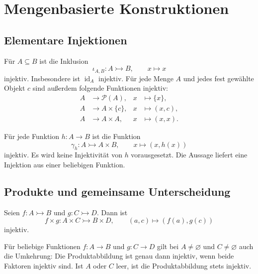 \chapter{Mengenbasierte Konstruktionen}
\label{b06guide:ch:constructions}

\section{Elementare Injektionen}

\begin{theorem}
\label{b06guide:thm:elementary}
Für $A\subseteq B$ ist die Inklusion
\[
 \iota_{A,B}\colon A\rightarrowtail B,\qquad x\mapsto x
\]
injektiv. Insbesondere ist $\operatorname{id}_A$ injektiv.
Für jede Menge $A$ und jedes fest gewählte Objekt $c$
sind außerdem folgende Funktionen injektiv:
\[
 \begin{aligned}
 A&\longrightarrow\mathcal P(A),&x&\longmapsto\{x\},\\
 A&\longrightarrow A\times\{c\},&x&\longmapsto(x,c),\\
 A&\longrightarrow A\times A,&x&\longmapsto(x,x).
 \end{aligned}
\]
\end{theorem}

\begin{theorem}[Graphabbildung]
\label{b06guide:thm:graphmap}
Für jede Funktion $h\colon A\to B$ ist die Funktion
\[
 \gamma_h\colon A\rightarrowtail A\times B,\qquad
 x\mapsto(x,h(x))
\]
injektiv. Es wird keine Injektivität von $h$ vorausgesetzt.
Die Aussage liefert eine Injektion aus einer beliebigen Funktion.
\end{theorem}

\section{Produkte und gemeinsame Unterscheidung}

\begin{theorem}
\label{b06guide:thm:product}
Seien $f\colon A\rightarrowtail B$ und $g\colon C\rightarrowtail D$.
Dann ist
\[
 f\times g\colon A\times C\rightarrowtail B\times D,\qquad
 (a,c)\mapsto(f(a),g(c))
\]
injektiv.

Für beliebige Funktionen $f\colon A\to B$ und $g\colon C\to D$
gilt bei $A\ne\varnothing$ und $C\ne\varnothing$ auch die Umkehrung:
Die Produktabbildung ist genau dann injektiv, wenn beide Faktoren
injektiv sind. Ist $A$ oder $C$ leer, ist die Produktabbildung
stets injektiv.
\end{theorem}

